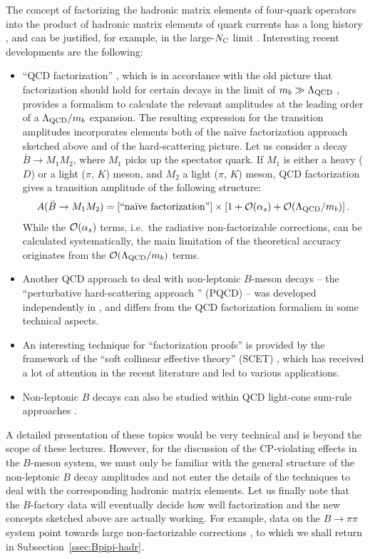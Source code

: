 \documentclass[12pt]{article}
\begin{document}
The concept of factorizing the hadronic matrix elements of four-quark 
operators into the product of hadronic matrix elements of quark currents 
has a long history \cite{Neu-Ste}, and can be justified, for example, 
in the large-$N_{\rm C}$ limit \cite{largeN}. Interesting recent 
developments are the following:
\begin{itemize}
\item ``QCD factorization'' \cite{BBNS}, which is in 
accordance with the old picture that factorization should 
hold for certain decays in the limit of $m_b\gg\Lambda_{\rm QCD}$ 
\cite{QCDF-old}, provides a formalism to calculate the 
relevant amplitudes at the leading order of a $\Lambda_{\rm QCD}/m_b$ 
expansion. The resulting expression for the transition amplitudes 
incorporates elements both of the na\"\i ve factorization approach 
sketched above and of the hard-scattering picture. Let us consider a 
decay $\bar B\to M_1M_2$, where $M_1$ picks up the spectator quark. 
If $M_1$ is either a heavy ($D$) or a light ($\pi$, $K$) meson, and 
$M_2$ a light ($\pi$, $K$) meson, QCD factorization gives a transition 
amplitude of the following structure:
\begin{equation}
A(\bar B\to M_1M_2)=\left[\mbox{``na\"\i ve factorization''}\right]
\times\left[1+{\cal O}(\alpha_s)+{\cal O}(\Lambda_{\rm QCD}/m_b)\right].
\end{equation}
While the ${\cal O}(\alpha_s)$ terms, i.e.\ the radiative
non-factorizable corrections, can be calculated systematically, 
the main limitation of the theoretical accuracy originates from 
the ${\cal O}(\Lambda_{\rm QCD}/m_b)$ terms. 

\item Another QCD approach to deal with non-leptonic $B$-meson decays -- 
the ``perturbative hard-scattering approach '' (PQCD) -- was developed 
independently in \cite{PQCD}, and differs from the QCD factorization 
formalism in some technical aspects.

\item An interesting technique for ``factorization proofs'' is provided 
by the framework of the ``soft collinear effective theory'' (SCET) 
\cite{SCET}, which has received a lot of attention in the recent literature 
and led to various applications.

\item Non-leptonic $B$ decays can also be studied within 
QCD light-cone sum-rule approaches \cite{sum-rules}.
\end{itemize}
A detailed presentation of these topics would be very technical and is
beyond the scope of these lectures. However, for the discussion of the
CP-violating effects in the $B$-meson system, we must only be familiar 
with the general structure of the non-leptonic $B$ decay amplitudes and 
not enter the details of the techniques to deal with the
corresponding hadronic matrix elements. Let us finally note that the 
$B$-factory data will eventually decide how well factorization and 
the new concepts sketched above are actually working. For example, 
data on the $B\to\pi\pi$ system point towards 
large non-factorizable corrections \cite{BFRS2,BFRS3}, to which we 
shall return in Subsection~\ref{ssec:Bpipi-hadr}.
\end{document}
